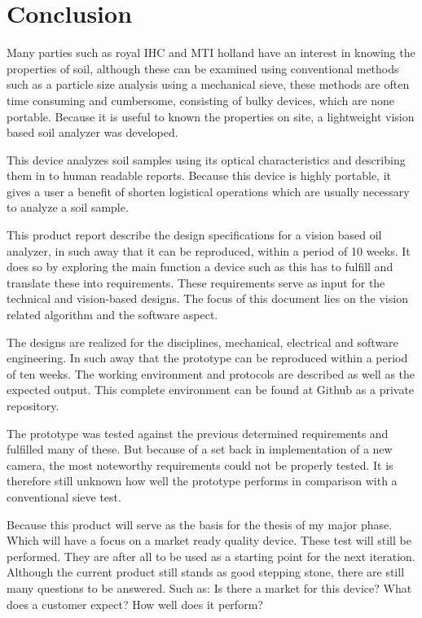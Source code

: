 \documentclass[11pt,fleqn,,a4paper,twoside,openright]{book}
\begin{document}
\chapter{Conclusion}\label{chap:conclusion}
Many parties such as royal IHC and MTI holland have an interest in knowing the properties of soil, although these can be examined using conventional methods such as a particle size analysis using a mechanical sieve, these methods are often time consuming and cumbersome, consisting of bulky devices, which are none portable. Because it is useful to known the properties on site, a lightweight vision based soil analyzer was developed.

This device analyzes soil samples using its optical characteristics and describing them in to human readable reports. Because this device is highly portable, it gives a user a benefit of shorten logistical operations which are usually necessary to analyze a soil sample. 

This product report describe the design specifications for a vision based oil analyzer, in such away that it can be reproduced, within a period of 10 weeks. It does so by exploring the main function a device such as this has to fulfill and translate these into requirements. These requirements serve as input for the technical and vision-based designs. The focus of this document lies on the vision related algorithm and the software aspect.

The designs are realized for the disciplines, mechanical, electrical and software engineering. In such away that the prototype can be reproduced within a period of ten weeks. The working environment and protocols are described as well as the expected output. This complete environment can be found at Github as a private repository.

The prototype was tested against the previous determined requirements and fulfilled many of these. But because of a set back in implementation of a new camera, the most noteworthy requirements could not be properly tested. It is therefore still unknown how well the prototype performs in comparison with a conventional sieve test.

Because this product will serve as the basis for the thesis of my major phase. Which will have a focus on a market ready quality device. These test will still be performed. They are after all to be used as a starting point for the next iteration. Although the current product still stands as good stepping stone, there are still many questions to be answered. Such as: Is there a market for this device? What does a customer expect? How well does it perform?
\end{document}
